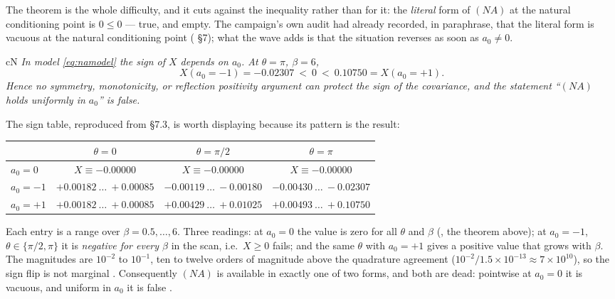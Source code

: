 The theorem is the whole difficulty, and it cuts against the inequality rather than for it: the
\emph{literal} form of $(NA)$ at the natural conditioning point is $0\le0$ --- true, and empty. The
campaign's own audit had already recorded, in paraphrase, that the literal form is vacuous at the
natural conditioning point ( \S7); what the wave adds is that the situation
reverses as soon as $a_0\ne0$.

\begin{claimbox}{cN}
 \emph{In model \eqref{eq:namodel} the
sign of $X$ depends on $a_0$. At $\theta=\pi$, $\beta=6$,}
\[
  X(a_0=-1)=-0.02307\ <\ 0\ <\ 0.10750=X(a_0=+1).
\]
\emph{Hence no symmetry, monotonicity, or reflection positivity argument can protect the sign of
the covariance, and the statement ``$(NA)$ holds uniformly in $a_0$'' is false.}
\end{claimbox}

The sign table, reproduced from  \S7.3, is worth displaying because its
pattern is the result:
\begin{center}
\footnotesize
\begin{tabular}{@{}lccc@{}}
\toprule
 & $\theta=0$ & $\theta=\pi/2$ & $\theta=\pi$\\
\midrule
$a_0=0$  & $X\equiv-0.00000$ & $X\equiv-0.00000$ & $X\equiv-0.00000$\\
$a_0=-1$ & $+0.00182\ \ldots\ +0.00085$ & $-0.00119\ \ldots\ -0.00180$ & $-0.00430\ \ldots\ -0.02307$\\
$a_0=+1$ & $+0.00182\ \ldots\ +0.00085$ & $+0.00429\ \ldots\ +0.01025$ & $+0.00493\ \ldots\ +0.10750$\\
\bottomrule
\end{tabular}
\end{center}
Each entry is a range over $\beta=0.5,\ldots,6$. Three readings: at $a_0=0$ the value is zero for
all $\theta$ and $\beta$ (\LT, the theorem above); at $a_0=-1$, $\theta\in\{\pi/2,\pi\}$ it is
\emph{negative for every $\beta$} in the scan, i.e.\ $X\ge0$ fails; and the same $\theta$ with
$a_0=+1$ gives a positive value that grows with $\beta$. The magnitudes are $10^{-2}$ to $10^{-1}$,
ten to twelve orders of magnitude above the quadrature agreement
($10^{-2}/1.5\times10^{-13}\approx7\times10^{10}$), so the sign flip is not marginal \LE.
Consequently $(NA)$ is available in exactly one of two forms, and both are dead: pointwise at
$a_0=0$ it is vacuous, and uniform in $a_0$ it is false \LN.


